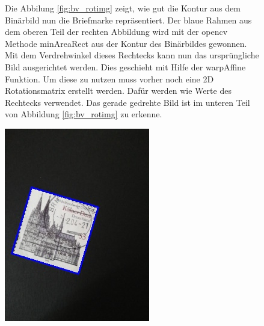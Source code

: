 \documentclass[12pt,toc=bib,toc=listof]{scrreprt}
\begin{document}
\begin{figure}[h]
\begin{minipage}[t]{.75\linewidth}

Die Abbilung \ref{fig:bv_rotimg} zeigt, wie gut die Kontur aus dem Binärbild nun die Briefmarke repräsentiert. Der blaue Rahmen aus dem oberen Teil der rechten Abbildung wird mit der opencv Methode minAreaRect aus der Kontur des Binärbildes gewonnen. Mit dem Verdrehwinkel dieses Rechtecks kann nun das ursprüngliche Bild ausgerichtet werden. Dies geschieht mit Hilfe der warpAffine Funktion. Um diese zu nutzen muss vorher noch eine 2D Rotationsmatrix erstellt werden. Dafür werden wie Werte des Rechtecks verwendet. Das gerade gedrehte Bild ist im unteren Teil von Abbildung \ref{fig:bv_rotimg} zu erkenne.
\end{minipage}
\hfill
\begin{minipage}[t]{.2\linewidth}
  \strut\vspace*{-\baselineskip}\newline\includegraphics[width=\linewidth]{./bilder/minarearect_dom}

\end{minipage}
\end{figure}
\end{document}
